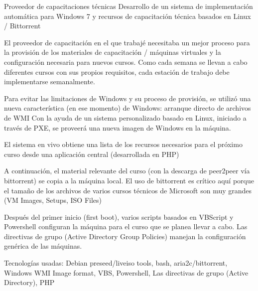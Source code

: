 \begin{cventries}
  \cventry
    {Proveedor de capacitaciones técnicas}
    {Desarrollo de un sistema de implementación automática para Windows 7 y recursos de capacitación técnica basados en Linux / Bittorrent}
    {}
    {}
    {
      \begin{cvitems}
      \item El proveedor de capacitación en el que trabajé necesitaba un mejor proceso para la provisión de
        los materiales de capacitación / máquinas virtuales y la configuración necesaria para nuevos
        cursos. Como cada semana se llevan a cabo diferentes cursos con sus propios requisitos, cada
        estación de trabajo debe implementarse semanalmente.
      \item  Para evitar las limitaciones de Windows y su proceso de provisión, se utilizó una nueva
        característica (en ese momento) de Windows: arranque directo de archivos de WMI
        Con la ayuda de un sistema personalizado basado en Linux, iniciado a través de PXE, se proveerá una nueva imagen de Windows en la máquina.
      \item El sistema en vivo obtiene una lista de los recursos necesarios para el próximo curso desde una aplicación central (desarrollada en PHP)
      \item A continuación, el material relevante del curso (con la descarga de peer2peer vía bittorrent) se
        copia a la máquina local. El uso de bittorrent es crítico aquí porque el tamaño de los archivos de
        varios cursos técnicos de Microsoft son muy grandes (VM Images, Setups, ISO Files)
      \item Después del primer inicio (first boot), varios scripts basados en VBScript y Powershell configuran
        la máquina para el curso que se planea llevar a cabo. Las directivas de grupo (Active Directory
        Group Policies) manejan la configuración genérica de las máquinas.
      \item Tecnologías usadas: Debian preseed/liveiso tools, bash, aria2c/bittorrent, Windows WMI Image
        format, VBS, Powershell, Las directivas de grupo (Active Directory), PHP
      \end{cvitems}
    }
\end{cventries}
\clearpage

